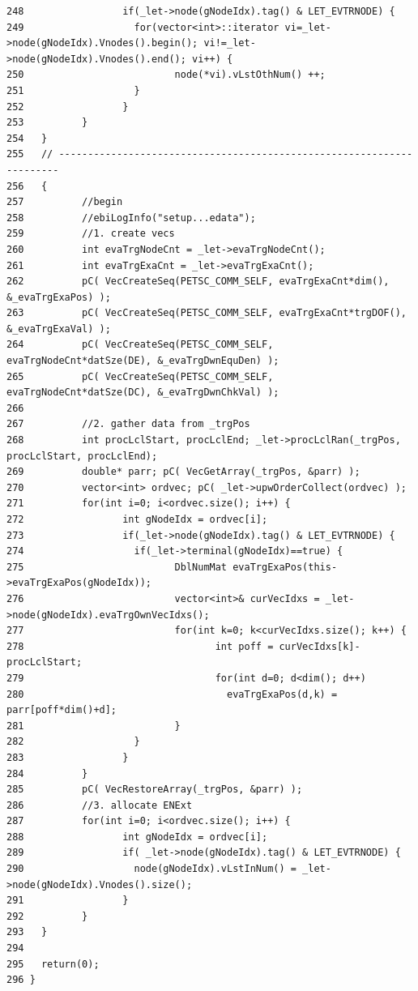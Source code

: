 \begin{verbatim}
248                 if(_let->node(gNodeIdx).tag() & LET_EVTRNODE) {
249                   for(vector<int>::iterator vi=_let->node(gNodeIdx).Vnodes().begin(); vi!=_let->node(gNodeIdx).Vnodes().end(); vi++) {
250                          node(*vi).vLstOthNum() ++;
251                   }
252                 }
253          }
254   }
255   // ---------------------------------------------------------------------- 
256   {
257          //begin
258          //ebiLogInfo("setup...edata");
259          //1. create vecs
260          int evaTrgNodeCnt = _let->evaTrgNodeCnt();
261          int evaTrgExaCnt = _let->evaTrgExaCnt();
262          pC( VecCreateSeq(PETSC_COMM_SELF, evaTrgExaCnt*dim(),  &_evaTrgExaPos) );
263          pC( VecCreateSeq(PETSC_COMM_SELF, evaTrgExaCnt*trgDOF(), &_evaTrgExaVal) );
264          pC( VecCreateSeq(PETSC_COMM_SELF, evaTrgNodeCnt*datSze(DE), &_evaTrgDwnEquDen) );
265          pC( VecCreateSeq(PETSC_COMM_SELF, evaTrgNodeCnt*datSze(DC), &_evaTrgDwnChkVal) );
266          
267          //2. gather data from _trgPos
268          int procLclStart, procLclEnd; _let->procLclRan(_trgPos, procLclStart, procLclEnd);
269          double* parr; pC( VecGetArray(_trgPos, &parr) );
270          vector<int> ordvec; pC( _let->upwOrderCollect(ordvec) );
271          for(int i=0; i<ordvec.size(); i++) {
272                 int gNodeIdx = ordvec[i];
273                 if(_let->node(gNodeIdx).tag() & LET_EVTRNODE) {
274                   if(_let->terminal(gNodeIdx)==true) {
275                          DblNumMat evaTrgExaPos(this->evaTrgExaPos(gNodeIdx));
276                          vector<int>& curVecIdxs = _let->node(gNodeIdx).evaTrgOwnVecIdxs();
277                          for(int k=0; k<curVecIdxs.size(); k++) {
278                                 int poff = curVecIdxs[k]-procLclStart;
279                                 for(int d=0; d<dim(); d++)
280                                   evaTrgExaPos(d,k) = parr[poff*dim()+d];
281                          }
282                   }
283                 }
284          }
285          pC( VecRestoreArray(_trgPos, &parr) );
286          //3. allocate ENExt
287          for(int i=0; i<ordvec.size(); i++) {
288                 int gNodeIdx = ordvec[i];
289                 if( _let->node(gNodeIdx).tag() & LET_EVTRNODE) {
290                   node(gNodeIdx).vLstInNum() = _let->node(gNodeIdx).Vnodes().size();
291                 }
292          }
293   }
294     
295   return(0);
296 }
\end{verbatim}\normalsize 


